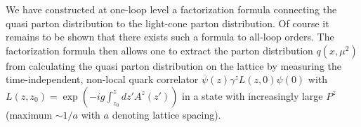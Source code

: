 We have constructed at one-loop level a factorization formula connecting the quasi parton distribution to the light-cone parton distribution. Of course it remains to be shown that there exists such a formula to all-loop orders. The factorization formula then allows one to extract the parton distribution $q(x,\mu^2)$ from calculating the quasi parton distribution on the lattice by measuring
the time-independent, non-local quark correlator $\overline{\psi}(z)\gamma^zL(z,0)\psi(0)$ with
$L(z,z_0) = \exp\left(-ig\int^{z}_{z_0} dz' A^z(z') \right)$ in a state with increasingly large $P^z$
(maximum $\sim 1/a$ with $a$ denoting lattice spacing).
